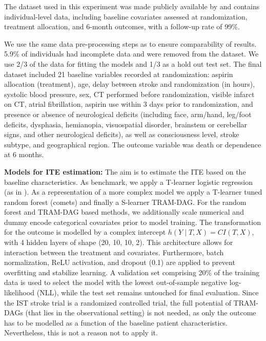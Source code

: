 The dataset used in this experiment was made publicly available by \citet{sandercock2011} and contains individual-level data, including baseline covariates assessed at randomization, treatment allocation, and 6-month outcomes, with a follow-up rate of 99\%.

We use the same data pre-processing steps as \citet{chen2025} to ensure comparability of results. 5.9\% of individuals had incomplete data and were removed from the dataset. We use 2/3 of the data for fitting the models and 1/3 as a hold out test set. The final dataset included 21 baseline variables recorded at randomization: aspirin allocation (treatment), age, delay between stroke and randomization (in hours), systolic blood pressure, sex, CT performed before randomization, visible infarct on CT, atrial fibrillation, aspirin use within 3 days prior to randomization, and presence or absence of neurological deficits (including face, arm/hand, leg/foot deficits, dysphasia, hemianopia, visuospatial disorder, brainstem or cerebellar signs, and other neurological deficits), as well as consciousness level, stroke subtype, and geographical region. The outcome variable was death or dependence at 6 months.


\textbf{Models for ITE estimation: } The aim is to estimate the ITE based on the baseline characteristics. As benchmark, we apply a T-learner logistic regression (as in \citet{chen2025}). As a representation of a more complex model we apply a T-learner tuned random forest (comets) and finally a S-learner TRAM-DAG. For the random forest and TRAM-DAG based methods, we additionally scale numerical and dummy encode categorical covariates prior to model training. The transformation for the outcome is modelled by a complex intercept $h(Y \mid T, X) = CI(T, X)$, with 4 hidden layers of shape (20, 10, 10, 2). This architecture allows for interaction between the treatment and covariates. Furthermore, batch normalization, ReLU activation, and dropout (0.1) are applied to prevent overfitting and stabilize learning. A validation set comprising 20\% of the training data is used to select the model with the lowest out-of-sample negative log-likelihood (NLL), while the test set remains untouched for final evaluation. Since the IST stroke trial is a randomized controlled trial, the full potential of TRAM-DAGs (that lies in the observational setting) is not needed, as only the outcome has to be modelled as a function of the baseline patient characteristics. Nevertheless, this is not a reason not to apply it.

